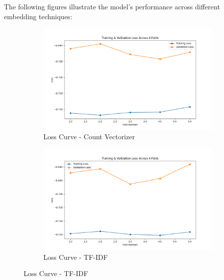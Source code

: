 The following figures illustrate the model’s performance across different embedding techniques:

\begin{figure}[H]
    \centering
    \begin{subfigure}[b]{0.48\textwidth}
        \includegraphics[width=\textwidth]{img/report_info/img/3.1.NaiveBayes/best_bayesian_count_loss.png}
        \caption{Loss Curve - Count Vectorizer}
        \label{fig:nb-count-loss}
    \end{subfigure}
    \begin{subfigure}[b]{0.48\textwidth}
        \includegraphics[width=\textwidth]{img/report_info/img/3.1.NaiveBayes/best_bayesian_tfidf_loss.png}
        \caption{Loss Curve - TF-IDF}
        \label{fig:nb-tfidf-loss}
    \end{subfigure}
    

\end{figure}
